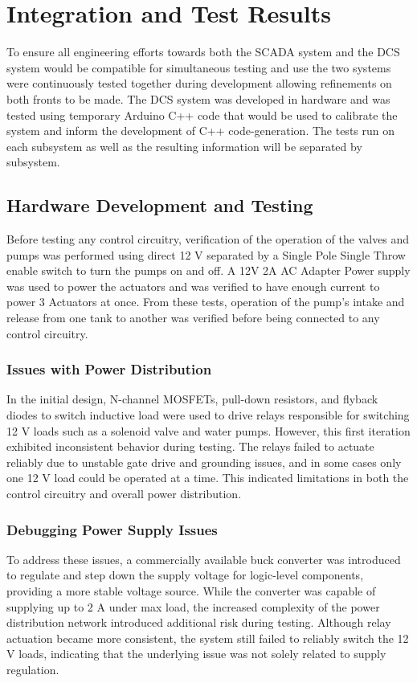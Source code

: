 \documentclass[../main.tex]{subfiles}
\begin{document}
\section{Integration and Test Results}
\label{sec:int_and_test}
To ensure all engineering efforts towards both the SCADA system and the DCS system would be compatible for simultaneous testing and use the two systems were continuously tested together during development allowing refinements on both fronts to be made. The DCS system was developed in hardware and was tested using temporary Arduino C++ code that would be used to calibrate the system and inform the development of C++ code-generation. The tests run on each subsystem as well as the resulting information will be separated by subsystem.





\subsection{Hardware Development and Testing}
Before testing any control circuitry, verification of the operation of the valves and pumps was performed using direct 12 V separated by a Single Pole Single Throw enable switch to turn the pumps on and off. A 12V 2A AC Adapter Power supply was used to power the actuators and was verified to have enough current to power 3 Actuators at once. From these tests, operation of the pump's intake and release from one tank to another was verified before being connected to any control circuitry.

\subsubsection{Issues with Power Distribution} 
In the initial design, N-channel MOSFETs, pull-down resistors, and flyback diodes to switch inductive load were used to drive relays responsible for switching 12 V loads such as a solenoid valve and water pumps. However, this first iteration exhibited inconsistent behavior during testing. The relays failed to actuate reliably due to unstable gate drive and grounding issues, and in some cases only one 12 V load could be operated at a time. This indicated limitations in both the control circuitry and overall power distribution.

\subsubsection{Debugging Power Supply Issues}
To address these issues, a commercially available buck converter was introduced to regulate and step down the supply voltage for logic-level components, providing a more stable voltage source. While the converter was capable of supplying up to 2 A under max load, the increased complexity of the power distribution network introduced additional risk during testing. Although relay actuation became more consistent, the system still failed to reliably switch the 12 V loads, indicating that the underlying issue was not solely related to supply regulation. 
\end{document}
